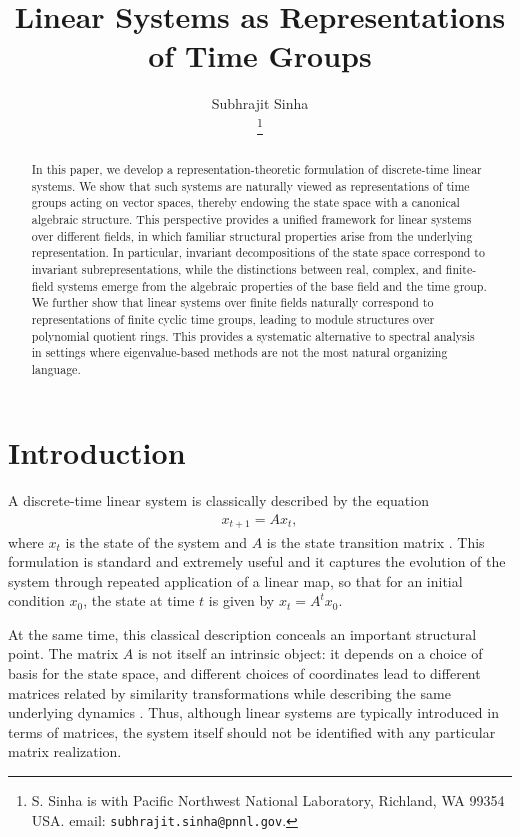 \documentclass[letterpaper, 9pt, conference]{ieeeconf}
\title{\LARGE \bf
Linear Systems as Representations of Time Groups}
\author{Subhrajit Sinha\\
\thanks{S. Sinha is with Pacific Northwest National Laboratory, Richland, WA 99354 USA. email: \texttt{subhrajit.sinha@pnnl.gov}.}
}
\begin{document}
\maketitle
\thispagestyle{empty}
\pagestyle{empty}

\begin{abstract}
In this paper, we develop a representation-theoretic formulation of
discrete-time linear systems. We show that such systems are naturally viewed as
representations of time groups acting on vector spaces, thereby endowing the
state space with a canonical algebraic structure. This perspective provides a
unified framework for linear systems over different fields, in which familiar
structural properties arise from the underlying representation. In particular,
invariant decompositions of the state space correspond to invariant
subrepresentations, while the distinctions between real, complex, and
finite-field systems emerge from the algebraic properties of the base field and
the time group. We further show that linear systems over finite fields
naturally correspond to representations of finite cyclic time groups, leading to
module structures over polynomial quotient rings. This provides a systematic
alternative to spectral analysis in settings where eigenvalue-based methods are
not the most natural organizing language.
\end{abstract}




\section{Introduction}\label{sec_intro}

A discrete-time linear system is classically described by the equation
\begin{eqnarray*}
x_{t+1} = A x_t,
\end{eqnarray*}
where $x_t$ is the state of the system and $A$ is the state transition matrix
\cite{kailath_linear_book}. This formulation is standard and extremely useful and it
captures the evolution of the system through repeated application of a linear
map, so that for an initial condition $x_0$, the state at time $t$ is given by
$x_t = A^t x_0$.

At the same time, this classical description conceals an important structural
point. The matrix $A$ is not itself an intrinsic object: it depends on a choice
of basis for the state space, and different choices of coordinates lead to
different matrices related by similarity transformations while describing the
same underlying dynamics \cite{kailath_linear_book}. Thus, although linear systems
are typically introduced in terms of matrices, the system itself should not be
identified with any particular matrix realization.
\end{document}
